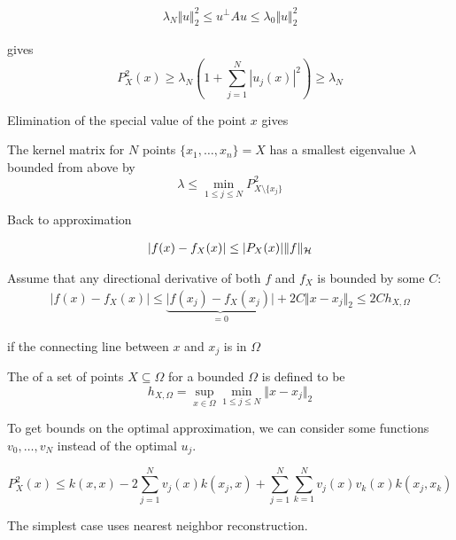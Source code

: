 \begin{align*}
    \lambda_N\Vert u\Vert_2^2\leq u^\perp A u\leq \lambda_0\Vert u\Vert_2^2
\end{align*}

gives 
\[P_X^2(x)\geq \lambda_N\left(1+\sum_{j=1}^N |u_j(x)|^2 \right)\geq \lambda_N\]

Elimination of the special value of the point $x$ gives 

\begin{theorem}\label{thm:2.6}
    The kernel matrix for $N$ points $\{x_1,\dots,x_n\}=X$ has a smallest
    eigenvalue $\lambda$ bounded from above by \[\lambda\leq \min_{1\leq j\leq N}P_{X\setminus\{x_j\}}^2\]
\end{theorem}

Back to approximation

\begin{align*}
    \vert f(x)-f_X(x)\vert\leq\vert P_X(x)\vert \Vert f\Vert_{\mathcal{H}}
\end{align*}

Assume that any directional derivative of both $f$ and $f_X$ is bounded 
by some $C$:
\begin{align*}
    \vert f(x)-f_X(x)\vert \leq \underbrace{\vert f(x_j)-f_X(x_j)\vert}_{=0} +2C\Vert x-x_j\Vert_2\leq 2Ch_{X,\Omega} 
\end{align*}

if the connecting line between $x$ and $x_j$ is in $\Omega$ %

\begin{definition}\label{def:2.7:fill_distance}
    The  of a set of points $X\subseteq \Omega$ for a 
    bounded $\Omega$ is defined to be 
    \[h_{X,\Omega}=\sup_{x\in\Omega}\min_{1\leq j\leq N}\Vert x-x_j\Vert_2\]
\end{definition}


To get bounds on the optimal approximation, we can consider 
some functions $v_0,\dots,v_N$ instead of the optimal $u_j$.

\begin{equation}\label{eq:006}
    P_X^2(x)\leq k(x,x)-2\sum_{j=1}^N v_j(x)k(x_j,x)+\sum_{j=1}^{N}\sum_{k=1}^{N}v_j(x)v_k(x)k(x_j,x_k)
\end{equation}

The simplest case uses nearest neighbor reconstruction. 

